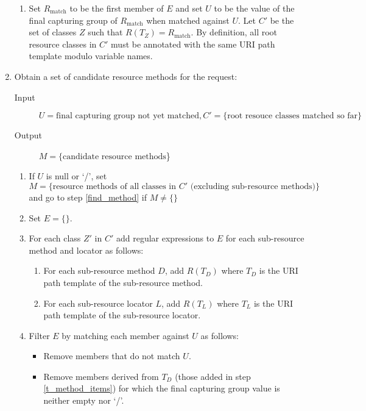 \begin{enumerate}
\begin{enumerate}
\item Set $R_{\mbox{match}}$ to be the first member of $E$ and set $U$ to be the value of the
final capturing group of $R_{\mbox{match}}$ when matched against $U$. Let $C'$ be the set
of classes $Z$ such that $R(T_Z)=R_{\mbox{match}}$. By definition, all root resource
classes in $C'$ must be annotated with the same URI path template modulo variable names.

\end{enumerate}

\item \label{find_object} Obtain a set of candidate resource methods for the request:

\begin{description}
\item[Input] $U=\mbox{final capturing group not yet matched}, C'=\{\mbox{root resouce classes matched so far}\}$
\item[Output] $M=\{\mbox{candidate resource methods}$\}
\end{description}

\begin{enumerate}
\item \label{check_null} If $U$ is null or \lq/\rq, set
$$M = \{\mbox{resource methods of all classes in $C'$ (excluding sub-resource methods)}\}$$
and go to step \ref{find_method} if $M \neq \{\}$ 

\item Set $E=\{\}$.

\item For each class $Z'$ in $C'$ add regular expressions to $E$ for each sub-resource method and locator as follows:
\begin{enumerate}
\item \label{t_method_items} For each sub-resource method $D$, add $R(T_D)$ where $T_D$ is the URI path template of the sub-resource method.
\item For each sub-resource locator $L$, add $R(T_L)$ where $T_L$ is the URI path template of the sub-resource locator.
\end{enumerate}

\item Filter $E$ by matching each member against $U$ as follows:
\begin{itemize}
\item Remove members that do not match $U$.
\item Remove members derived from $T_D$ (those added in step \ref{t_method_items}) for which the final capturing group value is neither empty nor \lq/\rq.
\end{itemize}


\end{enumerate}
\end{enumerate}
